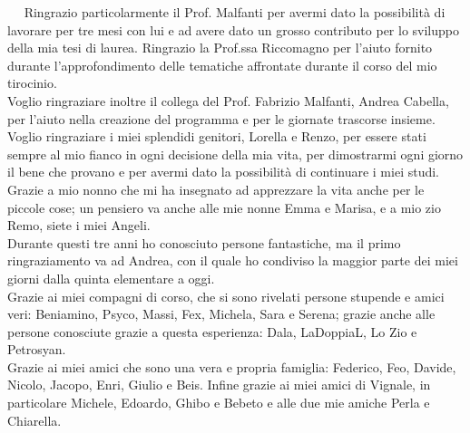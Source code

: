 \ \
\newline
Ringrazio particolarmente il Prof. Malfanti per avermi dato la possibilit\`a di lavorare per tre mesi con lui e ad avere dato un 
grosso contributo per lo sviluppo della mia tesi di laurea. Ringrazio la Prof.ssa Riccomagno per l'aiuto fornito 
durante l'approfondimento delle tematiche affrontate durante il corso del mio tirocinio.\\
Voglio ringraziare inoltre il collega del Prof. Fabrizio Malfanti, Andrea Cabella, per l'aiuto nella creazione 
del programma e per le giornate trascorse insieme.\\
Voglio ringraziare i miei splendidi genitori, Lorella e Renzo, per essere stati sempre al mio fianco in ogni decisione della mia vita, 
per dimostrarmi ogni giorno il bene che provano e per avermi dato la possibilit\`a di continuare i miei studi. Grazie a 
mio nonno che mi ha insegnato ad apprezzare la vita anche per le piccole cose; un pensiero va anche alle mie nonne 
Emma e Marisa, e a mio zio Remo, siete i miei Angeli.\\
Durante questi tre anni ho conosciuto persone fantastiche, ma il primo ringraziamento va ad Andrea, con il quale 
ho condiviso la maggior parte dei miei giorni dalla quinta elementare a oggi.\\
Grazie ai miei compagni di corso, che si sono rivelati persone 
stupende e amici veri: Beniamino, Psyco, Massi, Fex, Michela, Sara e Serena; grazie anche alle persone conosciute 
grazie a questa esperienza: Dala, LaDoppiaL, Lo Zio e Petrosyan.\\ 
Grazie ai miei amici che sono una vera e propria famiglia: Federico, Feo, Davide, Nicolo, Jacopo, Enri, Giulio e Beis. 
Infine grazie ai miei amici di Vignale, in particolare Michele, Edoardo, Ghibo e Bebeto e alle due mie amiche Perla e Chiarella.

